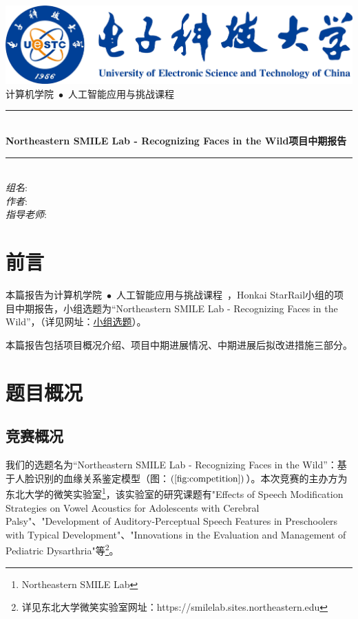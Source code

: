 \documentclass[UTF8]{ctexart}
\newcommand{\HRule}{\rule{\linewidth}{0.5mm}}
\begin{document}
\begin{titlepage}
\begin{center}
\includegraphics[width=\textwidth]{UESTC-Logo}\\[2cm]
\textsc{\LARGE 计算机学院~$\bullet$~人工智能应用与挑战课程~}\\[1.5cm]
\HRule \\[0.4cm]
{ \huge \bfseries Northeastern SMILE Lab - Recognizing Faces in the Wild项目中期报告\\[0.4cm] }

\HRule \\[1.5cm]
\noindent
\emph{组名}:\quad
{}\\
\emph{作者}:\quad
{}\footnotemark
{}\footnotemark
{}\footnotemark\\
\emph{指导老师}:\quad
{}
\end{center}
\end{titlepage}

\tableofcontents
\newpage

\section{前言}
本篇报告为计算机学院~$\bullet$~人工智能应用与挑战课程~，Honkai StarRail小组的项目中期报告，小组选题为“Northeastern SMILE Lab - Recognizing Faces in the Wild”，（详见网址：\href{https://www.kaggle.com/competitions/recognizing-faces-in-the-wild}{小组选题}）。

本篇报告包括项目概况介绍、项目中期进展情况、中期进展后拟改进措施三部分。

\section{题目概况}
\subsection{竞赛概况}
我们的选题名为“Northeastern SMILE Lab - Recognizing Faces in the Wild”：基于人脸识别的血缘关系鉴定模型（图：$\left(\ref{fig:competition}\right)$）。本次竞赛的主办方为东北大学的微笑实验室\footnote{Northeastern SMILE Lab}，该实验室的研究课题有"Effects of Speech Modification Strategies on Vowel Acoustics for Adolescents with Cerebral Palsy"、"Development of Auditory-Perceptual Speech Features in Preschoolers with Typical Development"、"Innovations in the Evaluation and Management of Pediatric Dysarthria"等\footnote{详见东北大学微笑实验室网址：https://smilelab.sites.northeastern.edu}。
\end{document}
